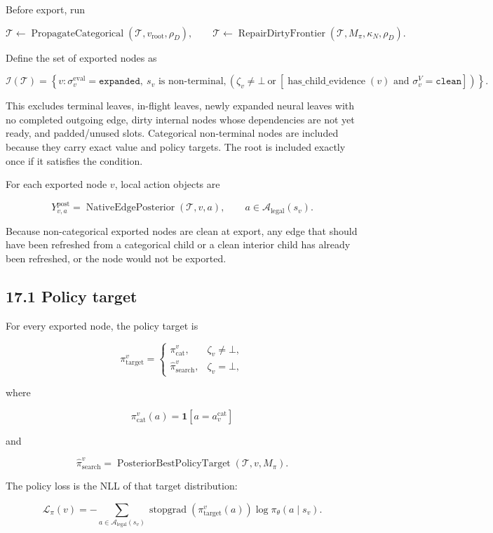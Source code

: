 \documentclass[11pt]{article}
\newcommand{\one}{\mathbf{1}}
\newcommand{\stopgrad}{\operatorname{stopgrad}}
\newcommand{\Tree}{\mathcal{T}}
\newcommand{\Legal}{\mathcal{A}_{\mathrm{legal}}}
\newcommand{\Interior}{\mathcal{I}}
\newcommand{\PosteriorBestPolicyTarget}{\operatorname{PosteriorBestPolicyTarget}}
\newcommand{\RepairDirtyFrontier}{\operatorname{RepairDirtyFrontier}}
\newcommand{\NativeEdgePosterior}{\operatorname{NativeEdgePosterior}}
\newcommand{\PropagateCategorical}{\operatorname{PropagateCategorical}}
\begin{document}
Before export, run

\[
\Tree\gets\PropagateCategorical(\Tree,v_{\mathrm{root}},\rho_D),
\qquad
\Tree\gets\RepairDirtyFrontier(\Tree,M_\pi,\kappa_N,\rho_D).
\]

Define the set of exported nodes as

\[
\Interior(\Tree)
=
\left\{
 v:
 \sigma^{\mathrm{eval}}_v=\texttt{expanded},
 \ s_v\text{ is non-terminal},
 \left(
 \zeta_v\ne\bot
 \ \text{or}\
 \left[\operatorname{has\_child\_evidence}(v)
 \text{ and }\sigma^V_v=\texttt{clean}\right]
 \right)
\right\}.
\]

This excludes terminal leaves, in-flight leaves, newly expanded neural leaves
with no completed outgoing edge, dirty internal nodes whose dependencies are not
yet ready, and padded/unused slots. Categorical non-terminal nodes are included
because they carry exact value and policy targets. The root is included exactly
once if it satisfies the condition.

For each exported node \(v\), local action objects are

\[
Y^{\mathrm{post}}_{v,a}
=
\NativeEdgePosterior(\Tree,v,a),
\qquad
 a\in\Legal(s_v).
\]

Because non-categorical exported nodes are clean at export, any edge that should
have been refreshed from a categorical child or a clean interior child has
already been refreshed, or the node would not be exported.

\subsection*{17.1 Policy target}

For every exported node, the policy target is

\[
\pi_{\mathrm{target}}^v
=
\begin{cases}
\pi_{\mathrm{cat}}^v,
& \zeta_v\ne\bot,\\[3pt]
\hat\pi_{\mathrm{search}}^v,
& \zeta_v=\bot,
\end{cases}
\]

where

\[
\pi_{\mathrm{cat}}^v(a)=\one[a=a_v^{\mathrm{cat}}]
\]

and

\[
\hat\pi_{\mathrm{search}}^v
=
\PosteriorBestPolicyTarget(\Tree,v,M_\pi).
\]

The policy loss is the NLL of that target distribution:

\[
\mathcal{L}_\pi(v)
=
-
\sum_{a\in\Legal(s_v)}
\stopgrad
\left(
\pi_{\mathrm{target}}^v(a)
\right)
\log
\pi_\theta(a\mid s_v).
\]
\end{document}
